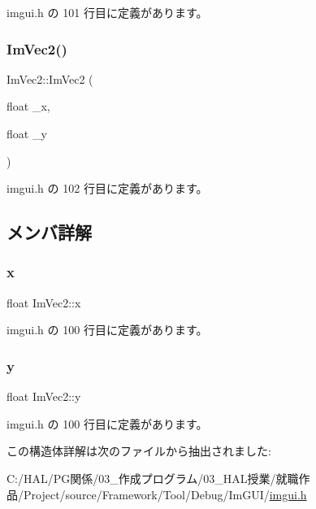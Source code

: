  imgui.\+h の 101 行目に定義があります。

\mbox{\label{struct_im_vec2_af2fd51a6c4bf6290676b235533b92c0d}} 
\subsubsection{\texorpdfstring{Im\+Vec2()}{ImVec2()}\hspace{0.1cm}{\footnotesize\ttfamily [2/2]}}
{\footnotesize\ttfamily Im\+Vec2\+::\+Im\+Vec2 (\begin{DoxyParamCaption}\item[{float}]{\+\_\+x,  }\item[{float}]{\+\_\+y }\end{DoxyParamCaption})\hspace{0.3cm}{\ttfamily [inline]}}



 imgui.\+h の 102 行目に定義があります。



\subsection{メンバ詳解}
\mbox{\label{struct_im_vec2_a5802a68560961ed8cb8cc5fb2a244c2d}} 
\subsubsection{\texorpdfstring{x}{x}}
{\footnotesize\ttfamily float Im\+Vec2\+::x}



 imgui.\+h の 100 行目に定義があります。

\mbox{\label{struct_im_vec2_a1f9d136ca837e147b793b19d25a3a618}} 
\subsubsection{\texorpdfstring{y}{y}}
{\footnotesize\ttfamily float Im\+Vec2\+::y}



 imgui.\+h の 100 行目に定義があります。



この構造体詳解は次のファイルから抽出されました\+:\begin{DoxyCompactItemize}
\item 
C\+:/\+H\+A\+L/\+P\+G関係/03\+\_\+作成プログラム/03\+\_\+\+H\+A\+L授業/就職作品/\+Project/source/\+Framework/\+Tool/\+Debug/\+Im\+G\+U\+I/\mbox{\hyperlink{imgui_8h}{imgui.\+h}}\end{DoxyCompactItemize}

